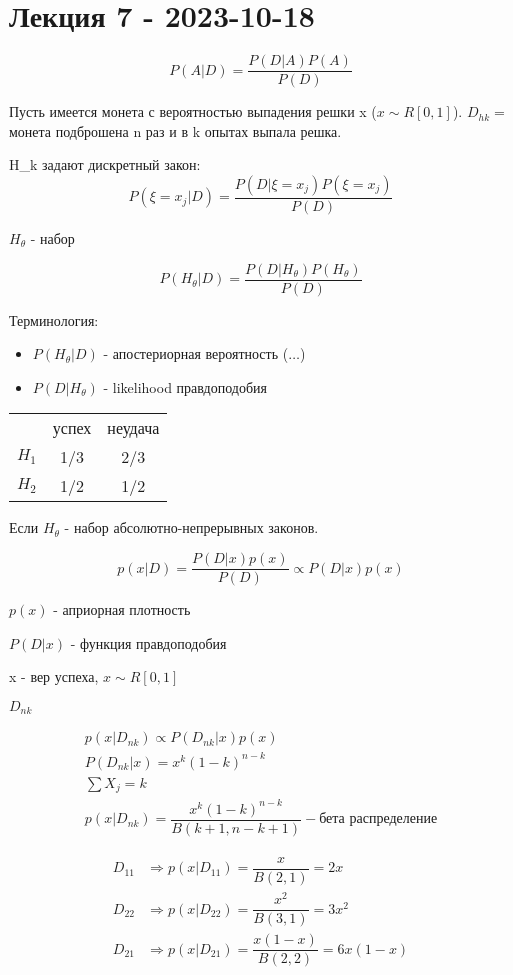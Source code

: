 \section{Лекция 7 - 2023-10-18}

\[
P(A|D) = \dfrac{P(D|A) P(A)}{P(D)}
\]

\begin{ex}
  Пусть имеется монета с вероятностью выпадения решки x ($x \sim R[0, 1]$).
  $D_{hk} = $ монета подброшена n раз и в k опытах выпала решка.
  
  H_k задают дискретный закон:
  $$P(\xi = x_j | D) = \dfrac{P(D|\xi=x_j) P(\xi=x_j)}{P(D)}$$

  $H_\theta$ - набор 

  $$P(H_\theta | D) = \dfrac{P(D|H_\theta) P(H_\theta)}{P(D)}$$

  Терминология:
  \begin{itemize}
    \item $P(H_\theta |D)$ - апостериорная вероятность ($\dots$)
    \item $P(D|H_\theta)$ - likelihood правдоподобия
  \end{itemize}
\end{ex}

\begin{ex}
  \begin{tabular}{|c|c|c|}
    & успех & неудача \\
    $H_1$ & 1/3 & 2/3 \\
    $H_2$ & 1/2 & 1/2
  \end{tabular}


\end{ex}

Если $H_\theta$ - набор абсолютно-непрерывных законов.

\[
  p(x|D) = \dfrac{P(D|x) p(x)}{P(D)} \propto P(D|x) p(x)
\]

$p(x)$ - априорная плотность

$P(D|x)$ - функция правдоподобия

\begin{ex}
  x - вер успеха, $x \sim R[0, 1]$

  $D_{nk}$

  \begin{multline*}
    p(x|D_{nk}) \propto P(D_{nk} | x) p(x) \\
    P(D_{nk} | x) = x^k (1-k)^{n-k} \\
    \sum X_j = k \\
    p(x|D_{nk}) = \dfrac{x^k (1-k)^{n-k}}{B(k+1, n-k+1)} - \text{бета распределение}
  \end{multline*}

  \begin{align*}
    D_{11} &\Rightarrow p(x|D_{11}) = \dfrac{x}{B(2, 1)} = 2x \\
    D_{22} &\Rightarrow p(x|D_{22}) = \dfrac{x^2}{B(3, 1)} = 3x^2 \\
    D_{21} &\Rightarrow p(x|D_{21}) = \dfrac{x (1-x)}{B(2, 2)} = 6x(1-x)
  \end{align*}
\end{ex}

